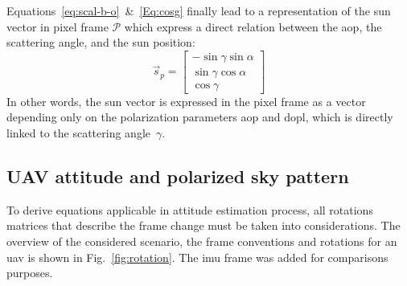 Equations~\eqref{eq:scal-b-o}~\&~\eqref{Eq:cosg} finally lead to a
representation of the sun vector in pixel frame $\mathcal{P}$ which express a
direct relation between the \gls{aop}, the scattering angle, and the sun
position:
\begin{equation}
  \label{eq:sunp}
  \vec{s}_{p} =
    \begin{bmatrix}
    -\sin\gamma \sin\alpha\\
    \sin\gamma \cos\alpha\\
    \cos\gamma
  \end{bmatrix}
\end{equation}
In other words, the sun vector is expressed in the pixel frame as a vector
depending only on the polarization parameters \gls{aop} and \gls{dopl}, which
is directly linked to the scattering angle~$\gamma$.

\subsection{UAV attitude and polarized sky pattern}
\label{subsec:ps-attitude}
To derive equations applicable in attitude estimation process, all rotations matrices that describe the frame change
must be taken into considerations. The overview of the considered scenario, the frame conventions and rotations
for an \gls{uav} is shown in Fig.~\ref{fig:rotation}. The \gls{imu} frame was added for comparisons purposes.

